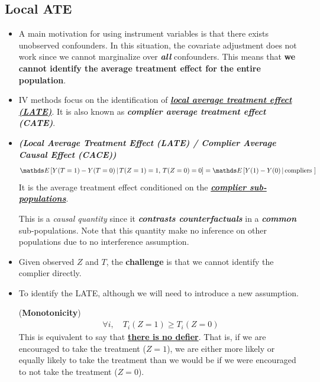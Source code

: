 \documentclass[11pt]{article}
\begin{document}
\subsection{Local ATE}
\begin{itemize}
\item A main motivation for using instrument variables is that there exists unobserved confounders. In this situation, the covariate adjustment does not work since we cannot marginalize over \emph{\textbf{all}} confounders.  This means that \textbf{we cannot identify the average treatment effect for the entire population}. 

\item IV methods focus on the identification of \underline{\emph{\textbf{local average treatment effect (LATE)}}}. It is also known as \emph{\textbf{complier average treatment effect (CATE)}}.

\item \begin{definition}\emph{\textbf{(Local Average Treatment Effect (LATE) / Complier Average Causal Effect (CACE))}} \citep{imbens2015causal, neal2020introduction}
\begin{align}
\E{}{Y(T=1) - Y(T=0) \,|\, T(Z=1)=1, \, T(Z=0)=0} = \E{}{Y(1) - Y(0) \,|\, \text{compliers }} \label{eqn: late}
\end{align} It is the average treatment effect conditioned on the \underline{\emph{\textbf{complier sub-populations}}}.
\end{definition}

This is a \emph{causal quantity} since it \textbf{\emph{contrasts counterfactuals}} in a \emph{\textbf{common}} sub-populations. Note that this quantity make no inference on other populations due to no interference assumption.

\item Given observed $Z$ and $T$, the \textbf{challenge} is that we cannot identify the complier directly.

\item To identify the LATE, although we will need to introduce a new assumption.
\begin{assumption} (\textbf{Monotonicity})
\begin{align}
\forall i, \quad  T_i(Z=1) \ge T_i(Z=0) \label{eqn: monotonicity}
\end{align} This is equivalent to say that \underline{\textbf{there is no defier}}. That is, if we are encouraged to take the treatment ($Z = 1$), we are either more likely or equally likely to take the treatment than we would be if we were encouraged to not take the treatment ($Z = 0$).
\end{assumption}


\end{itemize}
\end{document}
